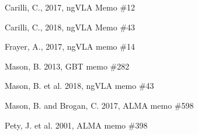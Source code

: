 \documentclass[11pt,twoside]{article}
\begin{document}
\begin{thebibliography}{}

 Carilli, C., 2017, ngVLA Memo \#12

 Carilli, C., 2018, ngVLA Memo \#43


 Frayer, A., 2017, ngVLA memo \#14


 Mason, B. 2013, GBT memo \#282

 Mason, B. et al. 2018, ngVLA memo \#43

 Mason, B. and Brogan, C. 2017, ALMA memo \#598
  



 Pety, J. et al. 2001, ALMA memo \#398
  
  
\end{thebibliography}
\end{document}
